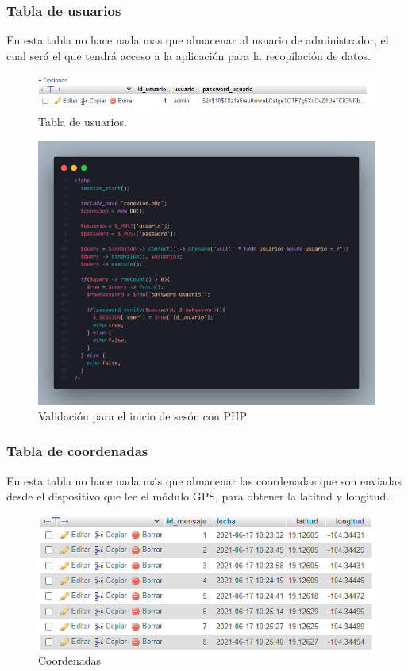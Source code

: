 \documentclass[12pt]{book}
\begin{document}
\vspace{5cm}


\subsubsection{Tabla de usuarios}
En esta tabla no hace nada mas que almacenar al usuario de administrador, el cual será el que tendrá acceso a la aplicación para la recopilación de datos.

\begin{figure}[h!]
	\centering
	\includegraphics[width=0.8\linewidth]{imagenes/dbusuario}
	\caption{Tabla de usuarios.}
	\label{fig:Tabla de usuarios}
\end{figure}

\begin{figure}[h!]
	\centering
	\includegraphics[width=0.8\linewidth]{imagenes/phplogin}
	\caption{Validación para el inicio de sesón con PHP}
	\label{fig:Validación para el inicio de sesón con PHP}
\end{figure}

\vspace{10cm}

\subsubsection{Tabla de coordenadas}
En esta tabla no hace nada más que almacenar las coordenadas que son enviadas desde el dispositivo que lee el módulo GPS, para obtener la latitud y longitud.

\begin{figure}[h]
	\centering
	\includegraphics[width=0.8\linewidth]{imagenes/dbcoordenadas}
	\caption{Coordenadas}
	\label{fig:Coordenadas}
\end{figure}
\end{document}
